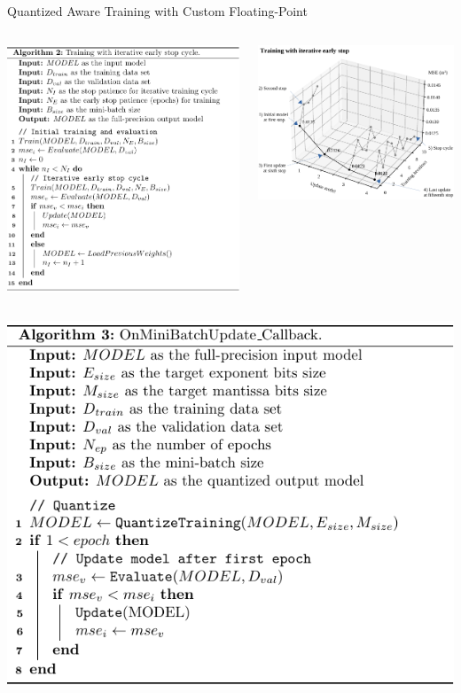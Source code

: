 \begin{frame}{Quantized Aware Training with Custom Floating-Point}
	\begin{columns}
		\centering
		\includegraphics[width=0.65\linewidth]{slides/algorithm_early_stop_1.pdf} %
		
		\centering
		\includegraphics[width=0.65\linewidth]{slides/figures/training_iterative_early_stop.pdf} %
	\end{columns}
	\pause %
	\begin{columns}
		\column{0.5\textwidth}
		\centering
		\includegraphics[width=0.65\linewidth]{slides/OnMiniBatchUpdate_2.pdf} %
		

\end{columns}
\end{frame}
